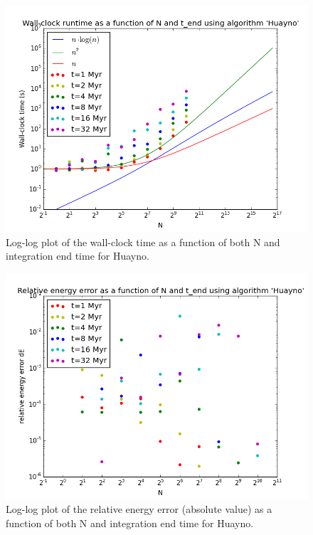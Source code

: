 \documentclass{aa}
\begin{document}
   \begin{figure}
   \centering
   \includegraphics[width=\hsize]{img/CA_GD_TLRH_s1603221_SS_s1617451_Huayno_runtime_log_plus_O.png}
      \caption{Log-log plot of the wall-clock time as a function of both N and integration 
               end time for Huayno.
              }
         \label{fig:Huayno_runtime}
   \end{figure}
   
   \begin{figure}
   \centering
   \includegraphics[width=\hsize]{img/CA_GD_TLRH_s1603221_SS_s1617451_Huayno_dE_log.png}
      \caption{Log-log plot of the relative energy error (absolute value) as a function of both N and integration 
               end time for Huayno.
              }
         \label{fig:Huayno_dE}
   \end{figure}
   
\end{document}
